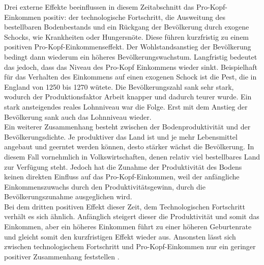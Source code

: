Drei externe Effekte beeinflussen in diesem Zeitabschnitt das Pro-Kopf-Einkommen positiv: der technologische Fortschritt, die Ausweitung des bestellbaren Bodenbestands und ein Rückgang der Bevölkerung durch exogene Schocks, wie Krankheiten oder Hungersnöte. Diese führen kurzfristig zu einem positiven Pro-Kopf-Einkommenseffekt. Der Wohlstandsanstieg der Bevölkerung bedingt dann wiederum ein höheres Bevölkerungswachstum. Langfristig bedeutet das jedoch, dass das Niveau des Pro-Kopf Einkommens wieder sinkt. Beispielhaft für das Verhalten des Einkommens auf einen exogenen Schock ist die Pest, die in England von 1250 bis 1270 wütete. Die Bevölkerungszahl sank sehr stark, wodurch der Produktionsfaktor Arbeit knapper und dadurch teurer wurde. Ein stark ansteigendes reales Lohnniveau war die Folge. Erst mit dem Anstieg der Bevölkerung sank auch das Lohnniveau wieder. \\ Ein weiterer Zusammenhang besteht zwischen der Bodenproduktivität und der Bevölkerungsdichte. Je produktiver das Land ist und je mehr Lebensmittel angebaut und geerntet werden können, desto stärker wächst die Bevölkerung. In diesem Fall vornehmlich in Volkswirtschaften, denen relativ viel bestellbares Land zur Verfügung steht. Jedoch hat die Zunahme der Produktivität des Bodens keinen direkten Einfluss auf das Pro-Kopf-Einkommen, weil der anfängliche Einkommenszuwachs durch den Produktivitätsgewinn, durch die Bevölkerungszunahme ausgeglichen wird. \\ Bei dem dritten positiven Effekt dieser Zeit, dem Technologischen Fortschritt verhält es sich ähnlich. Anfänglich steigert dieser die Produktivität und somit das Einkommen, aber ein höheres Einkommen führt zu einer höheren Geburtenrate und gleicht somit den kurzfristigen Effekt wieder aus. Ansonsten lässt sich zwischen technologischem Fortschritt und Pro-Kopf-Einkommen nur ein geringer positiver Zusammenhang feststellen \cite{Galor.2014}.
%
